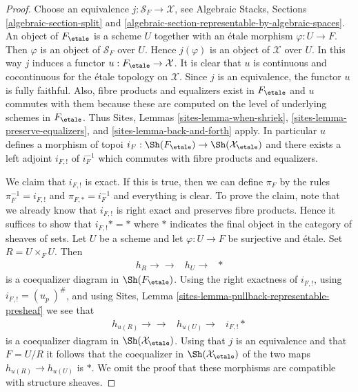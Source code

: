 \begin{proof}
Choose an equivalence $j : \mathcal{S}_F \to \mathcal{X}$, see
Algebraic Stacks, Sections \ref{algebraic-section-split} and
\ref{algebraic-section-representable-by-algebraic-spaces}.
An object of $F_\etale$ is a scheme $U$ together with an
\'etale morphism $\varphi : U \to F$. Then $\varphi$ is an object
of $\mathcal{S}_F$ over $U$. Hence $j(\varphi)$ is an object of
$\mathcal{X}$ over $U$. In this way $j$ induces a functor
$u : F_\etale \to \mathcal{X}$. It is clear that
$u$ is continuous and cocontinuous for the \'etale topology on
$\mathcal{X}$. Since $j$ is an equivalence, the functor $u$ is fully
faithful. Also, fibre products and equalizers exist in $F_\etale$
and $u$ commutes with them because these are computed on the level
of underlying schemes in $F_\etale$. Thus
Sites, Lemmas \ref{sites-lemma-when-shriek},
\ref{sites-lemma-preserve-equalizers}, and
\ref{sites-lemma-back-and-forth}
apply. In particular $u$ defines a morphism of topoi
$i_F : \Sh(F_\etale) \to \Sh(\mathcal{X}_\etale)$
and there exists a left adjoint $i_{F, !}$ of $i_F^{-1}$ which commutes
with fibre products and equalizers.

\medskip\noindent
We claim that $i_{F, !}$ is exact. If this is true, then we can define
$\pi_F$ by the rules $\pi_F^{-1} = i_{F, !}$ and $\pi_{F, *} = i_F^{-1}$
and everything is clear. To prove the claim, note that we already know
that $i_{F, !}$
is right exact and preserves fibre products. Hence it suffices to show
that $i_{F, !}* = *$ where $*$ indicates the final object in the category
of sheaves of sets. Let $U$ be a scheme and let
$\varphi : U \to F$ be surjective and \'etale. Set $R = U \times_F U$.
Then
$$
\begin{array}{ccc}h_R \longrightarrow\longrightarrow & h_U \longrightarrow & {*}\end{array}
$$
is a coequalizer diagram in $\Sh(F_\etale)$. Using the
right exactness of $i_{F, !}$, using $i_{F, !} = (u_p\ )^\#$, and using
Sites, Lemma \ref{sites-lemma-pullback-representable-presheaf}
we see that
$$
\begin{array}{ccc}h_{u(R)} \longrightarrow\longrightarrow & h_{u(U)} \longrightarrow & i_{F, !}{*}\end{array}
$$
is a coequalizer diagram in $\Sh(\mathcal{X}_\etale)$. Using that
$j$ is an equivalence and that $F = U/R$ it follows that
the coequalizer in $\Sh(\mathcal{X}_\etale)$ of the
two maps $h_{u(R)} \to h_{u(U)}$ is $*$. We omit the proof that
these morphisms are compatible with structure sheaves.
\end{proof}

